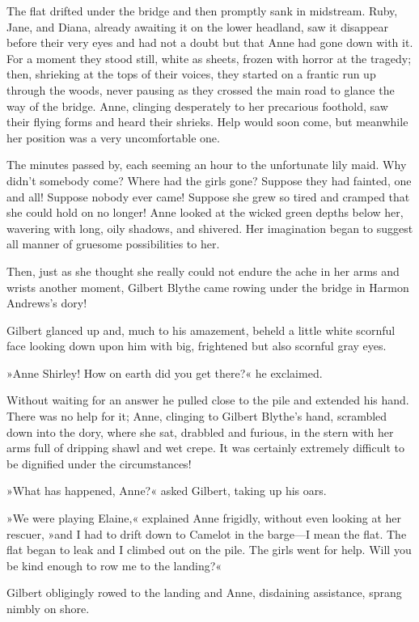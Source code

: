 The flat drifted under the bridge and then promptly sank in midstream. Ruby, Jane, and Diana, already awaiting it on the lower headland, saw it disappear before their very eyes and had not a doubt but that Anne had gone down with it. For a moment they stood still, white as sheets, frozen with horror at the tragedy; then, shrieking at the tops of their voices, they started on a frantic run up through the woods, never pausing as they crossed the main road to glance the way of the bridge. Anne, clinging desperately to her precarious foothold, saw their flying forms and heard their shrieks. Help would soon come, but meanwhile her position was a very uncomfortable one.

The minutes passed by, each seeming an hour to the unfortunate lily maid. Why didn't somebody come? Where had the girls gone? Suppose they had fainted, one and all! Suppose nobody ever came! Suppose she grew so tired and cramped that she could hold on no longer! Anne looked at the wicked green depths below her, wavering with long, oily shadows, and shivered. Her imagination began to suggest all manner of gruesome possibilities to her.

Then, just as she thought she really could not endure the ache in her arms and wrists another moment, Gilbert Blythe came rowing under the bridge in Harmon Andrews's dory!

Gilbert glanced up and, much to his amazement, beheld a little white scornful face looking down upon him with big, frightened but also scornful gray eyes.

»Anne Shirley! How on earth did you get there?« he exclaimed.

Without waiting for an answer he pulled close to the pile and extended his hand. There was no help for it; Anne, clinging to Gilbert Blythe's hand, scrambled down into the dory, where she sat, drabbled and furious, in the stern with her arms full of dripping shawl and wet crepe. It was certainly extremely difficult to be dignified under the circumstances!

»What has happened, Anne?« asked Gilbert, taking up his oars.

»We were playing Elaine,« explained Anne frigidly, without even looking at her rescuer, »and I had to drift down to Camelot in the barge—I mean the flat. The flat began to leak and I climbed out on the pile. The girls went for help. Will you be kind enough to row me to the landing?«

Gilbert obligingly rowed to the landing and Anne, disdaining assistance, sprang nimbly on shore.


